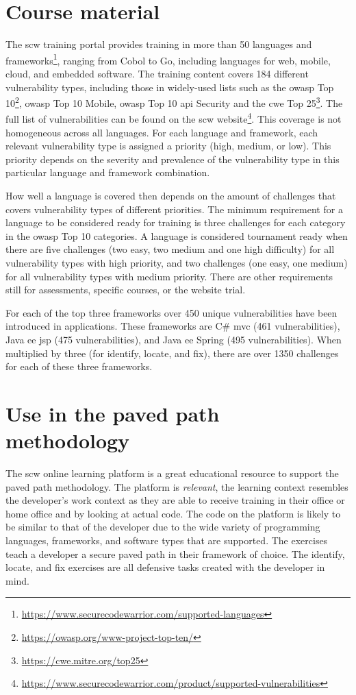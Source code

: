 \section{Course material}
The \gls{scw} training portal provides training in more than 50 languages and frameworks\footnote{\url{https://www.securecodewarrior.com/supported-languages}}, ranging from Cobol to Go, including languages for web, mobile, cloud, and embedded software.
The training content covers 184 different vulnerability types, including those in widely-used lists such as the \gls{owasp} Top 10\footnote{\url{https://owasp.org/www-project-top-ten/}}, \gls{owasp} Top 10 Mobile, \gls{owasp} Top 10 \gls{api} Security and the \gls{cwe} Top 25\footnote{\url{https://cwe.mitre.org/top25}}.
The full list of vulnerabilities can be found on the \gls{scw} website\footnote{\url{https://www.securecodewarrior.com/product/supported-vulnerabilities}}.
This coverage is not homogeneous across all languages.
For each language and framework, each relevant vulnerability type is assigned a priority (high, medium, or low).
This priority depends on the severity and prevalence of the vulnerability type in this particular language and framework combination.

How well a language is covered then depends on the amount of challenges that covers vulnerability types of different priorities. 
The minimum requirement for a language to be considered ready for training is three challenges for each category in the \gls{owasp} Top 10 categories.
A language is considered tournament ready when there are five challenges (two easy, two medium and one high difficulty) for all vulnerability types with high priority, and two challenges (one easy, one medium) for all vulnerability types with medium priority.
There are other requirements still for assessments, specific courses, or the website trial.

For each of the top three frameworks over 450 unique vulnerabilities have been introduced in applications. These frameworks are C\# \gls{mvc} (461 vulnerabilities), Java \gls{ee} \gls{jsp} (475 vulnerabilities), and Java \gls{ee} Spring (495 vulnerabilities). When multiplied by three (for identify, locate, and fix), there are over 1350 challenges for each of these three frameworks.

\section{Use in the paved path methodology}
The \gls{scw} online learning platform is a great educational resource to support the paved path methodology.
The platform is \textit{relevant}, the learning context resembles the developer's work context as they are able to receive training in their office or home office and by looking at actual code. 
The code on the platform is likely to be similar to that of the developer due to the wide variety of programming languages, frameworks, and software types that are supported. 
The exercises teach a developer a secure paved path in their framework of choice. The identify, locate, and fix exercises are all defensive tasks created with the developer in mind.

